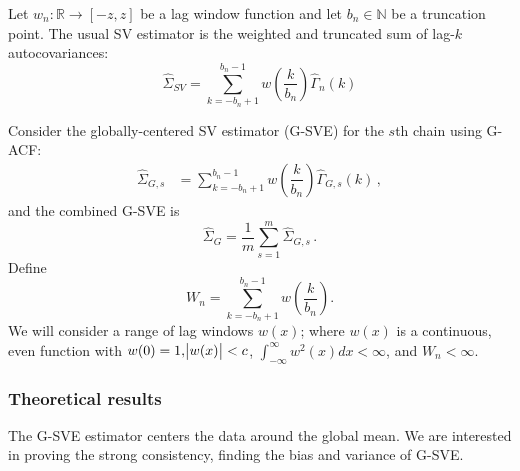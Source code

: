 \documentclass[11pt]{article}
\theoremstyle{remark}
\begin{document}



Let $w_n: \mathbb{R} \to [-z,z]$ be a lag window function and let $b_n \in \mathbb{N}$ be a truncation point. The usual SV estimator is the weighted and truncated sum of lag-$k$ autocovariances:
\begin{equation} \label{eq:sve}
    \hat{\Sigma}_{SV} = \sum_{k=-b_n+1}^{b_n-1}w\left(\dfrac{k}{b_n}\right)\hat{\Gamma}_n(k)
\end{equation}

Consider the globally-centered SV estimator (G-SVE) for the $s$th chain using G-ACF:
%
\begin{align*}
    \hat{\Sigma}_{G,s} &= \sum_{k=-b_n+1}^{b_n-1}w\left(\dfrac{k}{b_n}\right)\hat{\Gamma}_{G,s}(k)\,,
\end{align*}
and the combined G-SVE is
\[
\hat{\Sigma}_{G} =  \dfrac{1}{m}\sum_{s=1}^{m}\hat{\Sigma}_{G,s}\,.
\]
Define
%
\[
W_n = \sum_{k=-b_n+1}^{b_n-1}w\left(\dfrac{k}{b_n}\right).
\]
We will consider a range of lag windows $w(x)$; where $w(x)$ is a continuous, even function with $w(0)=1, \abs{w(x)} < c$, $\int_{-\infty}^{\infty}w^2(x)dx < \infty$, and $W_n < \infty$. 


\subsubsection{Theoretical results} \label{sec:G-SVE}

The G-SVE estimator centers the data around the global mean. We are interested in proving the strong consistency, finding the bias and variance of G-SVE. 
\end{document}
